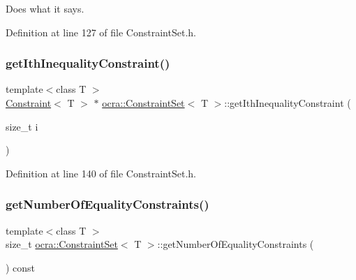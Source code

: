 Does what it says. 

Definition at line 127 of file Constraint\+Set.\+h.

\hypertarget{classocra_1_1ConstraintSet_af0de2bdd6267da2c53e7c9b3045dfb74}{}\label{classocra_1_1ConstraintSet_af0de2bdd6267da2c53e7c9b3045dfb74} 
\subsubsection{\texorpdfstring{get\+Ith\+Inequality\+Constraint()}{getIthInequalityConstraint()}}
{\footnotesize\ttfamily template$<$class T $>$ \\
\hyperlink{classocra_1_1Constraint}{Constraint}$<$ T $>$ $\ast$ \hyperlink{classocra_1_1ConstraintSet}{ocra\+::\+Constraint\+Set}$<$ T $>$\+::get\+Ith\+Inequality\+Constraint (\begin{DoxyParamCaption}\item[{size\+\_\+t}]{i }\end{DoxyParamCaption})\hspace{0.3cm}{\ttfamily [inline]}}



Definition at line 140 of file Constraint\+Set.\+h.

\hypertarget{classocra_1_1ConstraintSet_a95a113a808dfbf7a407c1ce000403941}{}\label{classocra_1_1ConstraintSet_a95a113a808dfbf7a407c1ce000403941} 
\subsubsection{\texorpdfstring{get\+Number\+Of\+Equality\+Constraints()}{getNumberOfEqualityConstraints()}}
{\footnotesize\ttfamily template$<$class T $>$ \\
size\+\_\+t \hyperlink{classocra_1_1ConstraintSet}{ocra\+::\+Constraint\+Set}$<$ T $>$\+::get\+Number\+Of\+Equality\+Constraints (\begin{DoxyParamCaption}{ }\end{DoxyParamCaption}) const\hspace{0.3cm}{\ttfamily [inline]}}



